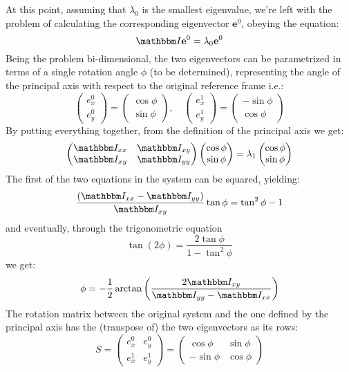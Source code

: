 \documentclass[a4paper,11pt]{article}
\newcommand{\itm}{\mathbbm I}
\newcommand{\itc}[1]{\itm_{#1}}
\begin{document}
At this point, assuming that $\lambda_0$ is the smallest eigenvalue, we're
left with the problem of calculating the corresponding eigenvector
$\mathbf{e}^0$, obeying the equation:
$$
\itm \mathbf{e}^0 = \lambda_0\mathbf{e}^0
$$
Being the problem bi-dimensional, the two eigenvectors can be parametrized in
terms of a single rotation angle $\phi$ (to be determined), representing the
angle of the principal axis with respect to the original reference frame i.e.:
\begin{equation}
  \begin{pmatrix}
    e^0_x\\
    e^0_y
  \end{pmatrix} = 
  \begin{pmatrix}
    \cos\phi\\
    \sin\phi
  \end{pmatrix},\quad
  \begin{pmatrix}
    e^1_x\\
    e^1_y
  \end{pmatrix} = 
  \begin{pmatrix}
    -\sin\phi\\
    \cos\phi
  \end{pmatrix}
\end{equation}
By putting everything together, from the definition of the principal axis
we get:
$$
\begin{pmatrix}
  \itc{xx} & \itc{xy}\\
  \itc{xy} & \itc{yy}
\end{pmatrix} 
\begin{pmatrix}
  \cos\phi\\
  \sin\phi
\end{pmatrix} = \lambda_1
\begin{pmatrix}
  \cos\phi\\
  \sin\phi
\end{pmatrix}
$$
The first of the two equations in the system can be squared, yielding:
$$
\frac{(\itc{xx} - \itc{yy})}{\itc{xy}}\tan\phi = \tan^2\phi - 1 
$$
and eventually, through the trigonometric equation
$$
\tan(2\phi) = \frac{2\tan\phi}{1 - \tan^2\phi}
$$
we get:
\begin{equation}
  \phi = -\frac{1}{2}
  \arctan \left( \frac{2\itc{xy}}{\itc{yy} - \itc{xx}} \right)
\end{equation}
The rotation matrix between the original system and the one defined by the
principal axis has the (transpose of) the two eigenvectors as its rows:
\begin{equation}
  S =
  \begin{pmatrix}
    e^0_x & e^0_y\\
    e^1_x & e^1_y
  \end{pmatrix} = 
  \begin{pmatrix}
    \cos\phi & \sin\phi\\
    -\sin\phi & \cos\phi
  \end{pmatrix}
\end{equation}
\end{document}
